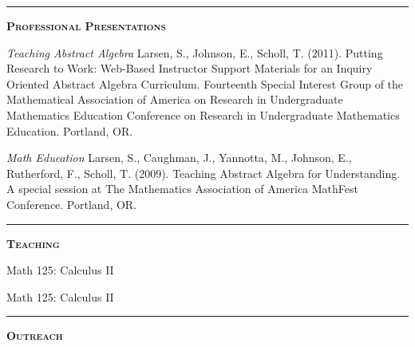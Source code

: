 \documentclass[12pt]{article}
\newcommand{\sectionheading}[1]
{
\bigskip %
\noindent
\hspace{-6.5mm}\textcolor{Gray}{\rule[.75mm]{21.5mm}{1mm}} %
\hspace{.2mm}	%
{\large{\textbf{\textsc{#1}}}} %
}
\newenvironment{date_section}
	{
	\vspace{-1ex}
	\leftmargini = 15ex
		\begin{itemize}[
			labelsep = *,
			labelwidth = 9ex,
			labelindent = 0ex,
			itemindent = !,
			font=\normalfont,
			align=parleft
		]{}
		\itemsep=-1.5mm
	}
	{\end{itemize}\vspace{-2ex}}
\newcommand{\yearmo}[2]{
	\item[
		{\makebox[1ex][r]{#1}}
		\hspace{1ex}
		{\makebox[1ex][l]{#2} }
		] }
\begin{document}
	\sectionheading{Professional Presentations}%

		\begin{date_section}

			\yearmo{2011}{} %
				\emph{Teaching Abstract Algebra}
				Larsen, S., Johnson, E., Scholl, T. (2011).
				Putting Research to Work: Web-Based Instructor
				Support Materials for an Inquiry Oriented
				Abstract Algebra Curriculum. Fourteenth Special
				Interest Group of the Mathematical Association
				of America on Research in Undergraduate
				Mathematics Education Conference on Research
				in Undergraduate Mathematics Education.
				Portland, OR.

			\yearmo{2009}{} %
				\emph{Math Education}
				Larsen, S., Caughman, J., Yannotta, M.,
				Johnson, E., Rutherford, F., Scholl, T.
				(2009). Teaching Abstract Algebra for
				Understanding. A special session at The
				Mathematics Association of America MathFest
				Conference. Portland, OR.

		\end{date_section}

	\sectionheading{Teaching}%

		\begin{date_section}

			\yearmo{2016}{June}%
				Math 125: Calculus II

			\yearmo{2015}{June}%
				Math 125: Calculus II


		\end{date_section}

	\sectionheading{Outreach}%
\end{document}
